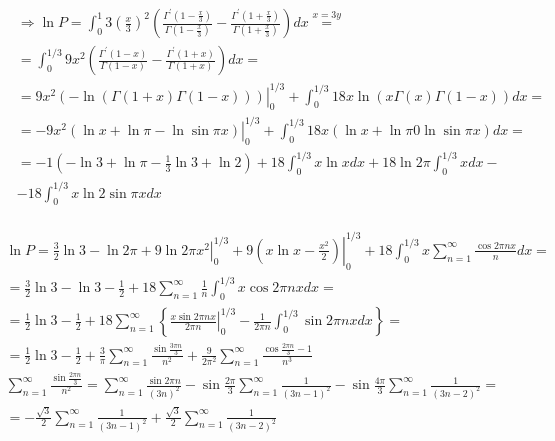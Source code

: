 	$$
	\begin{aligned}
		& \Rightarrow \ln P=\int_0^1 3\left(\frac{x}{3}\right)^2\left(\frac{\Gamma^{\prime}\left(1-\frac{x}{3}\right)}{\Gamma\left(1-\frac{x}{3}\right)}-\frac{\Gamma^{\prime}\left(1+\frac{x}{3}\right)}{\Gamma\left(1+\frac{x}{3}\right)}\right) d x \stackrel{x=3 y}{=} \\
		& =\int_0^{1 / 3} 9 x^2\left(\frac{\Gamma^{\prime}(1-x)}{\Gamma(1-x)}-\frac{\Gamma^{\prime}(1+x)}{\Gamma(1+x)}\right) d x= \\
		& =\left.9 x^2(-\ln (\Gamma(1+x) \Gamma(1-x)))\right|_0 ^{1 / 3}+\int_0^{1 / 3} 18 x \ln (x \Gamma(x) \Gamma(1-x)) d x= \\
		& =-\left.9 x^2(\ln x+\ln \pi-\ln \sin \pi x)\right|_0 ^{1 / 3}+\int_0^{1 / 3} 18 x(\ln x+\ln \pi 0 \ln \sin \pi x) d x= \\
		& =-1\left(-\ln 3+\ln \pi-\frac{1}{3} \ln 3+\ln 2\right)+18 \int_0^{1 / 3} x \ln x d x+18 \ln 2 \pi \int_0^{1 / 3} x d x- \\
		& -18 \int_0^{1 / 3} x \ln 2 \sin \pi x d x \\
		&
	\end{aligned}
	$$
	
	$$
	\begin{gathered}
		\ln P=\frac{3}{2} \ln 3-\ln 2 \pi+\left.9 \ln 2 \pi x^2\right|_0 ^{1 / 3}+\left.9\left(x \ln x-\frac{x^2}{2}\right)\right|_0 ^{1 / 3}+18 \int_0^{1 / 3} x \sum_{n=1}^{\infty} \frac{\cos 2 \pi n x}{n} d x= \\
		=\frac{3}{2} \ln 3-\ln 3-\frac{1}{2}+18 \sum_{n=1}^{\infty} \frac{1}{n} \int_0^{1 / 3} x \cos 2 \pi n x d x= \\
		=\frac{1}{2} \ln 3-\frac{1}{2}+18 \sum_{n=1}^{\infty}\left\{\left.\frac{x \sin 2 \pi n x}{2 \pi n}\right|_0 ^{1 / 3}-\frac{1}{2 \pi n} \int_0^{1 / 3} \sin 2 \pi n x d x\right\}= \\
		=\frac{1}{2} \ln 3-\frac{1}{2}+\frac{3}{\pi} \sum_{n=1}^{\infty} \frac{\sin \frac{3 \pi n}{3}}{n^2}+\frac{9}{2 \pi^2} \sum_{n=1}^{\infty} \frac{\cos \frac{2 \pi n}{3}-1}{n^3} \\
		\sum_{n=1}^{\infty} \frac{\sin \frac{2 \pi n}{3}}{n^2}=\sum_{n=1}^{\infty} \frac{\sin 2 \pi n}{(3 n)^2}-\sin \frac{2 \pi}{3} \sum_{n=1}^{\infty} \frac{1}{(3 n-1)^2}-\sin \frac{4 \pi}{3} \sum_{n=1}^{\infty} \frac{1}{(3 n-2)^2}= \\
		=-\frac{\sqrt{3}}{2} \sum_{n=1}^{\infty} \frac{1}{(3 n-1)^2}+\frac{\sqrt{3}}{2} \sum_{n=1}^{\infty} \frac{1}{(3 n-2)^2}
	\end{gathered}
	$$
	
